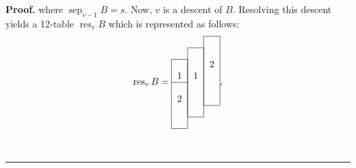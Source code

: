 \documentclass[numbers=enddot,12pt,final,onecolumn,notitlepage]{scrartcl}%
\theoremstyle{definition}
\newenvironment{proof}[1][Proof]{\noindent\textbf{#1.} }{\ \rule{0.5em}{0.5em}}
\begin{document}
\begin{proof}
where $\operatorname*{sep}\nolimits_{v-1}B = s$. Now, $v$ is a descent of $B$. Resolving this descent yields a 12-table $\operatorname*{res}%
\nolimits_{v}B$ which is represented as follows:%
\[
\operatorname*{res}\nolimits_{v}B=%
\begin{tabular}{ccc}
\cline{3-3} & & \multicolumn{1}{|c|}{} \\
\cline{2-2} & \multicolumn{1}{|c|}{} & \multicolumn{1}{|c|}{} \\
\cline{1-1} \multicolumn{1}{|c|}{} & \multicolumn{1}{|c|}{} & \multicolumn
{1}{|c|}{2} \\
\multicolumn{1}{|c|}{1} & \multicolumn{1}{|c|}{1} & \multicolumn{1}{|c|}{} \\
\cline{1-1} \multicolumn{1}{|c|}{} & \multicolumn{1}{|c|}{} & \multicolumn
{1}{|c|}{} \\
\multicolumn{1}{|c|}{2} & \multicolumn{1}{|c|}{} & \multicolumn{1}{|c|}{} \\
\cline{3-3} \multicolumn{1}{|c|}{} & \multicolumn{1}{|c|}{} \\
\cline{2-2} \multicolumn{1}{|c|}{} \\
\cline{1-1}
\end{tabular}%
,
\]

\end{proof}
\end{document}
